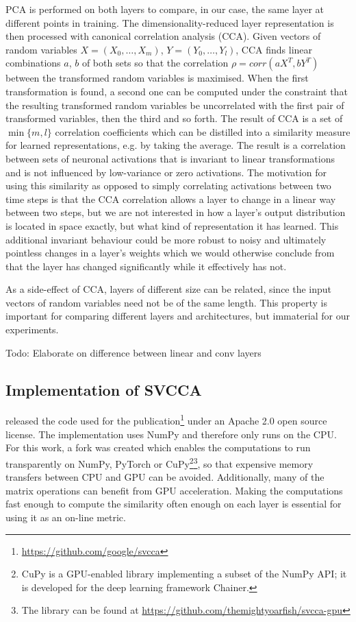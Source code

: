 PCA is performed on both layers to compare, in our case, the same layer at
different points in training. The dimensionality-reduced layer representation is
then processed with canonical correlation analysis (CCA).  Given vectors of
random variables $X=(X_0, \ldots, X_m)$, $Y=(Y_0, \ldots, Y_l)$, CCA finds
linear combinations $a$, $b$ of both sets so that the correlation $\rho =
corr(aX^T, bY^T )$ between the transformed random variables is maximised. When
the first transformation is found, a second one can be computed under the
constraint that the resulting transformed random variables be uncorrelated with
the first pair of transformed variables, then the third and so forth. The result
of CCA is a set of $\min\{m,l\}$ correlation coefficients which can be distilled
into a similarity measure for learned representations, e.g. by taking the
average. The result is a correlation between sets of neuronal activations that
is invariant to linear transformations and is not influenced by low-variance or
zero activations. The motivation for using this similarity as opposed to simply
correlating activations between two time steps is that the CCA correlation
allows a layer to change in a linear way between two steps, but we are not
interested in how a layer's output distribution is located in space exactly, but
what kind of representation it has learned. This additional invariant behaviour
could be more robust to noisy and ultimately pointless changes in a layer's
weights which we would otherwise conclude from that the layer has changed
significantly while it effectively has not.

As a side-effect of CCA, layers of different size can be related, since the
input vectors of random variables need not be of the same length. This property
is important for comparing different layers and architectures, but immaterial
for our experiments.

Todo: Elaborate on difference between linear and conv layers

\subsection{Implementation of SVCCA}%
\label{sub:implementation_of_svcca}

\citeauthor{raghu2017svcca} released the code used for the
publication\footnote{\url{https://github.com/google/svcca}} under an Apache 2.0
open source license. The implementation uses NumPy and therefore only runs on
the CPU. For this work, a fork was created which enables the computations to run
transparently on NumPy, PyTorch or CuPy\footnote{CuPy is a GPU-enabled library
implementing a subset of the NumPy API; it is developed for the deep learning
framework Chainer.}\footnote{The library can be found at
\url{https://github.com/themightyoarfish/svcca-gpu}}, so  that expensive memory
transfers between CPU and GPU can be avoided. Additionally, many of the matrix
operations can benefit from GPU acceleration. Making the computations fast
enough to compute the similarity often enough on each layer is essential for
using it as an on-line metric.

